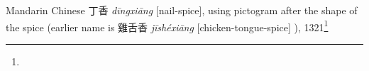 \begin{etymology}\label{ety:dingxiang}
Mandarin Chinese {丁香} \textit{dīngxiāng} [nail-spice], using pictogram after the shape of the spice (earlier name is 雞舌香 \textit{jīshéxiāng} [chicken-tongue-spice]  ), 1321\footnote{}
\end{etymology}